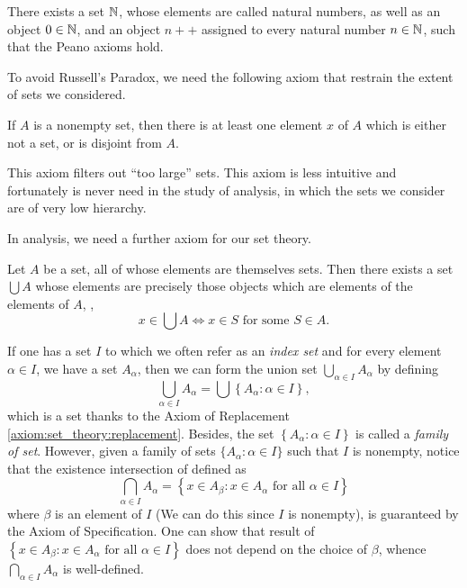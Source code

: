 \begin{axiom}
There exists a set $\mathbb{N}$, whose elements are called natural numbers, as 
well as an object $0 \in \mathbb{N}$, and an object $n++$ assigned to every natural 
number $n \in \mathbb{N}$, such that the Peano axioms hold. 
\end{axiom}

To avoid Russell's Paradox, we need the following axiom that restrain the 
extent of sets we considered. 
\begin{axiom}[Regularity]
If $A$ is a nonempty set, then there is at least one element $x$ of $A$ 
which is either not a set, or is disjoint from $A$. 
\end{axiom}

This axiom filters out ``too large'' sets. 
This axiom is less intuitive and fortunately is never need in the study of 
analysis, in which the sets we consider are of very low hierarchy. 

In analysis, we need a further axiom for our set theory. 
\begin{axiom}[Union]
\label{axiom:set_theory:union}
Let $A$ be a set, all of whose elements are themselves sets. 
Then there exists a set $\bigcup A$ whose elements are precisely those 
objects which are elements of the elements of $A$, \ie, 
\begin{equation*}
    x \in \bigcup A \iff x \in S \text{ for some } S \in A. 
\end{equation*}
\end{axiom}

If one has a set $I$ to which we often refer as an \emph{index set} and for 
every element $\alpha \in I$, we have a set $A_\alpha$, then we can form 
the union set $\bigcup_{\alpha \in I} A_\alpha$ by defining 
\begin{equation*}
    \bigcup_{\alpha \in I} A_\alpha 
    = \bigcup \left\{ A_\alpha: \alpha \in I \right\}, 
\end{equation*}
which is a set thanks to the Axiom of Replacement 
\ref{axiom:set_theory:replacement}. 
Besides, the set $\left\{ A_\alpha: \alpha \in I \right\}$ is called a 
\emph{family of set}. 
However, given a family of sets $\{ A_\alpha: \alpha \in I \}$ such that 
$I$ is nonempty, notice that the existence intersection of  defined as 
\begin{equation*}
    \bigcap_{\alpha \in I} A_\alpha 
    = \left\{ x \in A_\beta: 
        x \in A_\alpha \text{ for all } \alpha \in I \right\}
\end{equation*}
where $\beta$ is an element of $I$ (We can do this since $I$ is nonempty), 
is guaranteed by the Axiom of Specification. 
One can show that result of $\left\{ x \in A_\beta: x \in A_\alpha 
\text{ for all } \alpha \in I \right\}$ does not depend on the choice of 
$\beta$, whence $\bigcap_{\alpha \in I} A_\alpha$ is well-defined. 

